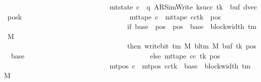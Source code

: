 \begin{isabellebody}
\ \ \ \ \ \ \ \ \ \ \ \ \ \ \ \ \ \ \ \ \ \ \ \ \ \ \ \ \ {\isasymand}\ mt{\isacharunderscore}{\kern0pt}state\ c{\isacharprime}{\kern0pt}{\isacharprime}{\kern0pt}\ {\isacharequal}{\kern0pt}\ {\isacharparenleft}{\kern0pt}q{\isacharcomma}{\kern0pt}\ AR{\isacharunderscore}{\kern0pt}SimWrite{\isacharcomma}{\kern0pt}\ k{\isacharunderscore}{\kern0pt}succ\ tk{\isacharcomma}{\kern0pt}\ {}{\isacharcomma}{\kern0pt}\ buf{\isacharcomma}{\kern0pt}\ dvec{\isacharcomma}{\kern0pt}\ posk{\isacharparenright}{\kern0pt}\isanewline
\ \ \ \ \ \ \ \ \ \ \ \ \ \ \ \ \ \ \ \ \ \ \ \ \ \ \ \ \ {\isasymand}\ mt{\isacharunderscore}{\kern0pt}tape\ c{\isacharprime}{\kern0pt}{\isacharprime}{\kern0pt}\ {\isacharequal}{\kern0pt}\ {\isacharparenleft}{\kern0pt}mt{\isacharunderscore}{\kern0pt}tape\ cc{\isacharparenright}{\kern0pt}{\isacharparenleft}{\kern0pt}tk\ {\isacharcolon}{\kern0pt}{\isacharequal}{\kern0pt}\ {\isacharparenleft}{\kern0pt}{\isasymlambda}pos{\isachardot}{\kern0pt}\isanewline
\ \ \ \ \ \ \ \ \ \ \ \ \ \ \ \ \ \ \ \ \ \ \ \ \ \ \ \ \ \ \ \ \ \ \ if\ base{\isacharprime}{\kern0pt}\ {\isasymle}\ pos\ {\isasymand}\ pos\ {\isacharless}{\kern0pt}\ base{\isacharprime}{\kern0pt}\ {\isacharplus}{\kern0pt}\ block{\isacharunderscore}{\kern0pt}width\ {\isacharparenleft}{\kern0pt}{\isasymGamma}{\isacharunderscore}{\kern0pt}tm\ M{\isacharparenright}{\kern0pt}\isanewline
\ \ \ \ \ \ \ \ \ \ \ \ \ \ \ \ \ \ \ \ \ \ \ \ \ \ \ \ \ \ \ \ \ \ \ then\ write{\isacharunderscore}{\kern0pt}bit\ {\isacharparenleft}{\kern0pt}{\isasymGamma}{\isacharunderscore}{\kern0pt}tm\ M{\isacharparenright}{\kern0pt}\ {\isacharparenleft}{\kern0pt}bl{\isacharunderscore}{\kern0pt}tm\ M{\isacharparenright}{\kern0pt}\ {\isacharparenleft}{\kern0pt}buf\ tk{\isacharparenright}{\kern0pt}\ {\isacharparenleft}{\kern0pt}pos\ {\isacharminus}{\kern0pt}\ base{\isacharprime}{\kern0pt}{\isacharparenright}{\kern0pt}\isanewline
\ \ \ \ \ \ \ \ \ \ \ \ \ \ \ \ \ \ \ \ \ \ \ \ \ \ \ \ \ \ \ \ \ \ \ else\ mt{\isacharunderscore}{\kern0pt}tape\ cc\ tk\ pos{\isacharparenright}{\kern0pt}{\isacharparenright}{\kern0pt}\isanewline
\ \ \ \ \ \ \ \ \ \ \ \ \ \ \ \ \ \ \ \ \ \ \ \ \ \ \ \ \ {\isasymand}\ mt{\isacharunderscore}{\kern0pt}pos\ c{\isacharprime}{\kern0pt}{\isacharprime}{\kern0pt}\ {\isacharequal}{\kern0pt}\ {\isacharparenleft}{\kern0pt}mt{\isacharunderscore}{\kern0pt}pos\ cc{\isacharparenright}{\kern0pt}{\isacharparenleft}{\kern0pt}tk\ {\isacharcolon}{\kern0pt}{\isacharequal}{\kern0pt}\ base{\isacharprime}{\kern0pt}\ {\isacharplus}{\kern0pt}\ block{\isacharunderscore}{\kern0pt}width\ {\isacharparenleft}{\kern0pt}{\isasymGamma}{\isacharunderscore}{\kern0pt}tm\ M{\isacharparenright}{\kern0pt}{\isacharparenright}{\kern0pt}{\isachardoublequoteclose}\isanewline

\end{isabellebody}
